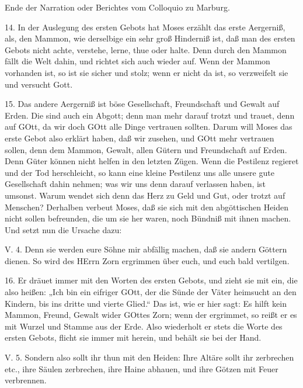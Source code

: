 Ende der Narration oder Berichtes vom Colloquio zu Marburg.

14. In der Auslegung des ersten Gebots hat Moses erzählt das erste Aergerniß, als, den Mammon, wie derselbige ein sehr groß Hinderniß ist, daß man des ersten Gebots nicht achte, verstehe, lerne, thue oder halte. Denn durch den Mammon fällt die Welt dahin, und richtet sich auch wieder auf. Wenn der Mammon vorhanden ist, so ist sie sicher und stolz; wenn er nicht da ist, so verzweifelt sie und versucht Gott.

15. Das andere Aergerniß ist böse Gesellschaft, Freundschaft und Gewalt auf Erden. Die sind auch ein Abgott; denn man mehr darauf trotzt und trauet, denn auf GOtt, da wir doch GOtt alle Dinge vertrauen sollten. Darum will Moses das erste Gebot also erklärt haben, daß wir zusehen, und GOtt mehr vertrauen sollen, denn dem Mammon, Gewalt, allen Gütern und Freundschaft auf Erden. Denn Güter können nicht helfen in den letzten Zügen. Wenn die Pestilenz regieret und der Tod herschleicht, so kann eine kleine Pestilenz uns alle unsere gute Gesellschaft dahin nehmen; was wir uns denn darauf verlassen haben, ist umsonst. Warum wendet sich denn das Herz zu Geld und Gut, oder trotzt auf Menschen? Derhalben verbeut Moses, daß sie sich mit den abgöttischen Heiden nicht sollen befreunden, die um sie her waren, noch Bündniß mit ihnen machen. Und setzt nun die Ursache dazu:

\begin{schriftzitat}
V. 4. Denn sie werden eure Söhne mir abfällig machen, daß sie andern Göttern dienen. So wird des HErrn Zorn ergrimmen über euch, und euch bald vertilgen.
\end{schriftzitat}

16. Er dräuet immer mit den Worten des ersten Gebots, und zieht sie mit ein, die also heißen: „Ich bin ein eifriger GOtt, der die Sünde der Väter heimsucht an den Kindern, bis ins dritte und vierte Glied.“ Das ist, wie er hier sagt: Es hilft kein Mammon, Freund, Gewalt wider GOttes Zorn; wenn der ergrimmet, so reißt er es mit Wurzel und Stamme aus der Erde. Also wiederholt er stets die Worte des ersten Gebots, flicht sie immer mit herein, und behält sie bei der Hand.

\begin{schriftzitat}
V. 5. Sondern also sollt ihr thun mit den Heiden: Ihre Altäre sollt ihr zerbrechen etc., ihre Säulen zerbrechen, ihre Haine abhauen, und ihre Götzen mit Feuer verbrennen.
\end{schriftzitat}

